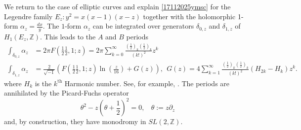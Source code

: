 \documentclass[11pt,leqno]{article}
\theoremstyle{remark}
\theoremstyle{definition}
\begin{document}





We return to the case of elliptic curves and explain \cref{17112025ymsc} for the Legendre family $E_z:y^2=x(x-1)(x-z)$ together with the holomorphic 1-form $\alpha_z = \frac{dx}{y}$. The $1$-form $\alpha_z$ can be integrated over generators $\delta_{0,z}$ and $\delta_{1,z}$ of $H_1(E_z,\mathbb{Z})$. This leads to the  $A$ and $B$ periods
\begin{align*}
\int_{\delta_{0,z}}\alpha_z &= 2\pi F\left(\frac{1}{2} \frac{1}{2},1; z\right)=
2\pi\sum_{k=0}^\infty \frac{(\frac{1}{2})_k (\frac{1}{2})_k}{(k!)^2} z^k
\\
\int_{\delta_{1,z}} \alpha_z &= \frac{2}{\sqrt{-1}}\left(F\left(\frac{1}{2} \frac{1}{2},1; z\right)\ln\left(\frac{z}{16}\right)+G(z)\right),\ \ \mathbb{ }G(z)=4\sum_{k=1}^\infty 
 \frac{(\frac{1}{2})_k (\frac{1}{2})_k}{(k!)^2}
(H_{2k}-H_k)z^k.
\end{align*}
where $H_k$ is the $k^\text{th}$ Harmonic number. See, for example, \cite{Zagier2018ArithmeticTopologyDE}. The periods are annihilated by the Picard-Fuchs operator
\[
\theta^2-z\left(\theta+\frac{1}{2}\right)^2=0,\ \ \ \ \theta:=z\partial_z
~\]
and, by construction, they have monodromy in $SL(2,\mathbb{Z})$. 
\end{document}
